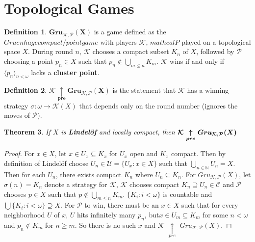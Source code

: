 \documentclass{amsart}
\theoremstyle{plain}
\newtheorem{theorem}{Theorem}
\theoremstyle{definition}
\newtheorem{definition}[theorem]{Definition}
\theoremstyle{remark}
\begin{document}
\section{Topological Games}

	\begin{definition}
		$\boldsymbol{Gru_{\mathcal{K},\mathcal{P}}(X)}$ is a game defined as the $Gruenhage compact/point game$ with players $\mathcal{K}$, $mathcal{P}$ played on a topological space $X$. During round $n$, $\mathcal{K}$ chooses a compact subset $K_n$ of $X$, followed by $\mathcal{P}$ choosing a point $p_n \in X$ such that $p_n \not\in \bigcup_{m\leq n}K_m$. $\mathcal{K}$ wins if and only if $\langle p_n \rangle_{n<\omega}$ lacks a \textbf{cluster point}. \cite{Clontz2015}
	\end{definition}
	
	\begin{definition}
	$\boldsymbol{\mathcal{K} \underset{pre}{\uparrow} Gru_{\mathcal{K}, \mathcal{P}}(X)}$ is the statement that $\mathcal{K}$ has a winning strategy $\sigma : \omega \rightarrow \mathcal{K}(X)$ that depends only on the round number (ignores the moves of $\mathcal{P}$). \cite{Clontz2015}
	\end{definition}

	\begin{theorem}
		If $X$ is \textbf{Lindel\"of} and locally compact, then $\boldsymbol{\mathcal{K}$ $\underset{pre}{\uparrow}$ $Gru_{\mathcal{K}, \mathcal{P}} (X)}$
	\end{theorem}
	\begin{proof}
		For $x \in X$, let $x \in U_x \subseteq K_x$ for $U_x$ open and $K_x$ compact. Then by definition of Lindel\"of choose $U_n \in \mathcal{U} = \lbrace U_x : x \in X \rbrace$ such that $\underset{n \in \mathbb{N}}{\bigcup}U_n = X$. Then for each $U_n$, there exists compact $K_n$ where $U_n \subseteq K_n$. \newline
		For $Gru_{\mathcal{K}, \mathcal{P}} (X)$, let $\sigma(n) = K_n$ denote a strategy for $\mathcal{K}$, $\mathcal{K}$ chooses compact $K_n \supseteq U_n \in \mathcal{C}$ and $\mathcal{P}$ chooses $p \in X$ such that $p \not\in \underset{m \leq n}{\bigcup}K_m$. $\lbrace K_i : i < \omega \rbrace$ is countable and $\bigcup \lbrace K_i : i < \omega \rbrace \supseteq X$. For $\mathcal{P}$ to win, there must be an $x \in X$ such that for every neighborhood $U$ of $x$, $U$ hits infinitely many $p_n$, but$x \in U_m \subseteq K_m$ for some $n < \omega$ and $p_n \not\in K_m$ for $n \geq m$. So there is no such $x$ and $\mathcal{K}$ $\underset{pre}{\uparrow}$ $Gru_{\mathcal{K}, \mathcal{P}} (X)$.
	\end{proof}
\end{document}
